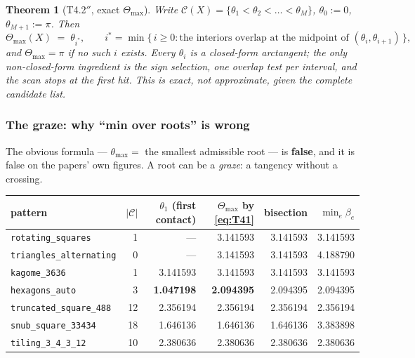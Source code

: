 \documentclass[11pt,a4paper]{article}
\newtheorem{theorem}{Theorem}[section]
\theoremstyle{definition}
\newcommand{\Tmax}{\Theta_{\max}}
\newcommand{\file}[1]{\texttt{\small #1}}
\begin{document}
\begin{theorem}[T4.2$''$, exact $\Tmax$]
\label{thm:t422}
Write $\mathcal{C}(X)=\{\theta_1<\theta_2<\dots<\theta_M\}$, $\theta_0:=0$,
$\theta_{M+1}:=\pi$. Then
\begin{equation}
\Tmax(X) \;=\; \theta_{i^*},\qquad
i^* = \min\{\,i\ge0 : \text{the interiors overlap at the midpoint of }(\theta_i,\theta_{i+1})\,\},
\label{eq:T41}
\end{equation}
and $\Tmax=\pi$ if no such $i$ exists. Every $\theta_i$ is a closed-form arctangent; the only
non-closed-form ingredient is the \emph{sign selection}, one overlap test per interval, and
the scan stops at the first hit. This is exact, not approximate, given the complete candidate
list.
\end{theorem}

\subsubsection{The graze: why ``min over roots'' is wrong}

The obvious formula --- $\theta_{\max}=$ the smallest admissible root --- is \textbf{false},
and it is false on the papers' own figures. A root can be a \emph{graze}: a tangency without
a crossing.

\begin{center}
\small
\begin{tabular}{@{}lrrrrr@{}}
\toprule
pattern & $|\mathcal{C}|$ & $\theta_1$ (first contact) & $\Tmax$ by \eqref{eq:T41} & bisection & $\min_e\beta_e$ \\
\midrule
\file{rotating\_squares} & 1 & --- & 3.141593 & 3.141593 & 3.141593 \\
\file{triangles\_alternating} & 0 & --- & 3.141593 & 3.141593 & 4.188790 \\
\file{kagome\_3636} & 1 & 3.141593 & 3.141593 & 3.141593 & 3.141593 \\
\rowcolor{yellow!18}\file{hexagons\_auto} & 3 & \textbf{1.047198} & \textbf{2.094395} & 2.094395 & 2.094395 \\
\file{truncated\_square\_488} & 12 & 2.356194 & 2.356194 & 2.356194 & 2.356194 \\
\file{snub\_square\_33434} & 18 & 1.646136 & 1.646136 & 1.646136 & 3.383898 \\
\file{tiling\_3\_4\_3\_12} & 10 & 2.380636 & 2.380636 & 2.380636 & 2.380636 \\
\bottomrule
\end{tabular}
\end{center}
\end{document}
